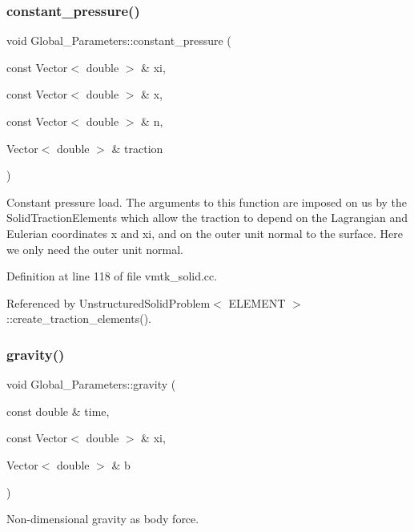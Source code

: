 \subsubsection{\texorpdfstring{constant\+\_\+pressure()}{constant\_pressure()}}
{\footnotesize\ttfamily void Global\+\_\+\+Parameters\+::constant\+\_\+pressure (\begin{DoxyParamCaption}\item[{const Vector$<$ double $>$ \&}]{xi,  }\item[{const Vector$<$ double $>$ \&}]{x,  }\item[{const Vector$<$ double $>$ \&}]{n,  }\item[{Vector$<$ double $>$ \&}]{traction }\end{DoxyParamCaption})}



Constant pressure load. The arguments to this function are imposed on us by the Solid\+Traction\+Elements which allow the traction to depend on the Lagrangian and Eulerian coordinates x and xi, and on the outer unit normal to the surface. Here we only need the outer unit normal. 



Definition at line 118 of file vmtk\+\_\+solid.\+cc.



Referenced by Unstructured\+Solid\+Problem$<$ E\+L\+E\+M\+E\+N\+T $>$\+::create\+\_\+traction\+\_\+elements().

\mbox{\label{namespaceGlobal__Parameters_a200109847bf4cc26da4d00e8d68d569e}} 
\subsubsection{\texorpdfstring{gravity()}{gravity()}}
{\footnotesize\ttfamily void Global\+\_\+\+Parameters\+::gravity (\begin{DoxyParamCaption}\item[{const double \&}]{time,  }\item[{const Vector$<$ double $>$ \&}]{xi,  }\item[{Vector$<$ double $>$ \&}]{b }\end{DoxyParamCaption})}



Non-\/dimensional gravity as body force. 



